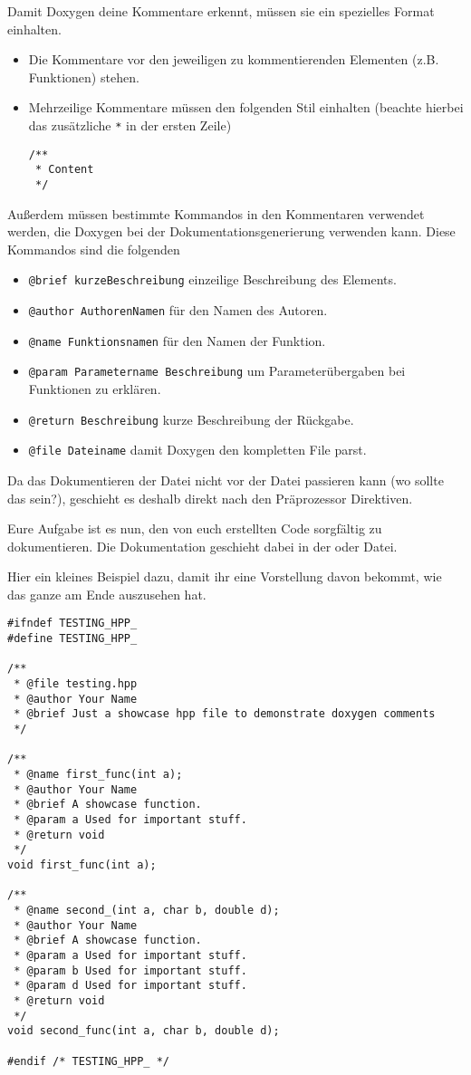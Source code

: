 Damit Doxygen deine Kommentare erkennt, müssen sie ein spezielles Format einhalten.
\begin{itemize}
    \item Die Kommentare vor den jeweiligen zu kommentierenden Elementen (z.B. Funktionen) stehen.
    \item{Mehrzeilige Kommentare müssen den folgenden Stil einhalten (beachte hierbei das zusätzliche \lstinline{*} in der ersten Zeile)
        \begin{lstlisting}
/**
 * Content
 */
        \end{lstlisting}}
\end{itemize}

Außerdem müssen bestimmte Kommandos in den Kommentaren verwendet werden, die Doxygen bei der Dokumentationsgenerierung verwenden kann.
Diese Kommandos sind die folgenden

\begin{itemize}
    \item \lstinline{@brief kurzeBeschreibung} einzeilige Beschreibung des Elements.
    \item \lstinline{@author AuthorenNamen} für den Namen des Autoren.
    \item \lstinline{@name Funktionsnamen} für den Namen der Funktion.
    \item \lstinline{@param Parametername Beschreibung} um Parameterübergaben bei Funktionen zu erklären.
    \item \lstinline{@return Beschreibung} kurze Beschreibung der Rückgabe.
    \item \lstinline{@file Dateiname} damit Doxygen den kompletten File parst.
\end{itemize}

Da das Dokumentieren der Datei nicht vor der Datei passieren kann (wo sollte das sein?), geschieht es deshalb direkt nach den Präprozessor Direktiven.

Eure Aufgabe ist es nun, den von euch erstellten Code sorgfältig zu dokumentieren.
Die Dokumentation geschieht dabei in der  oder  Datei.

Hier ein kleines Beispiel dazu, damit ihr eine Vorstellung davon bekommt, wie das ganze am Ende auszusehen hat.

\begin{lstlisting}
#ifndef TESTING_HPP_
#define TESTING_HPP_

/**
 * @file testing.hpp
 * @author Your Name
 * @brief Just a showcase hpp file to demonstrate doxygen comments
 */

/**
 * @name first_func(int a);
 * @author Your Name
 * @brief A showcase function.
 * @param a Used for important stuff.
 * @return void
 */
void first_func(int a);

/**
 * @name second_(int a, char b, double d);
 * @author Your Name
 * @brief A showcase function.
 * @param a Used for important stuff.
 * @param b Used for important stuff.
 * @param d Used for important stuff.
 * @return void
 */
void second_func(int a, char b, double d);

#endif /* TESTING_HPP_ */
\end{lstlisting}

